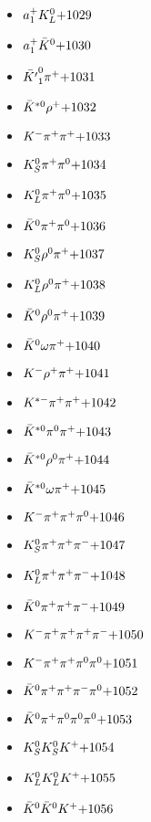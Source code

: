 \begin{multicols}{3}
\begin{itemize}
 \item $ a_{1}^{+} K_{L}^{0} \hfill{+1029}$
 \item $ a_{1}^{+} \bar{K}^{0} \hfill{+1030}$
 \item $ \bar{{K^{\prime}}}_{1}^{0} \pi^{+} \hfill{+1031}$
 \item $ \bar{K}^{*0} \rho^{+} \hfill{+1032}$
 \item $ K^{-} \pi^{+} \pi^{+} \hfill{+1033}$
 \item $ K_{S}^{0} \pi^{+} \pi^{0} \hfill{+1034}$
 \item $ K_{L}^{0} \pi^{+} \pi^{0} \hfill{+1035}$
 \item $ \bar{K}^{0} \pi^{+} \pi^{0} \hfill{+1036}$
 \item $ K_{S}^{0} \rho^{0} \pi^{+} \hfill{+1037}$
 \item $ K_{L}^{0} \rho^{0} \pi^{+} \hfill{+1038}$
 \item $ \bar{K}^{0} \rho^{0} \pi^{+} \hfill{+1039}$
 \item $ \bar{K}^{0} \omega \pi^{+} \hfill{+1040}$
 \item $ K^{-} \rho^{+} \pi^{+} \hfill{+1041}$
 \item $ K^{*-} \pi^{+} \pi^{+} \hfill{+1042}$
 \item $ \bar{K}^{*0} \pi^{0} \pi^{+} \hfill{+1043}$
 \item $ \bar{K}^{*0} \rho^{0} \pi^{+} \hfill{+1044}$
 \item $ \bar{K}^{*0} \omega \pi^{+} \hfill{+1045}$
 \item $ K^{-} \pi^{+} \pi^{+} \pi^{0} \hfill{+1046}$
 \item $ K_{S}^{0} \pi^{+} \pi^{+} \pi^{-} \hfill{+1047}$
 \item $ K_{L}^{0} \pi^{+} \pi^{+} \pi^{-} \hfill{+1048}$
 \item $ \bar{K}^{0} \pi^{+} \pi^{+} \pi^{-} \hfill{+1049}$
 \item $ K^{-} \pi^{+} \pi^{+} \pi^{+} \pi^{-} \hfill{+1050}$
 \item $ K^{-} \pi^{+} \pi^{+} \pi^{0} \pi^{0} \hfill{+1051}$
 \item $ \bar{K}^{0} \pi^{+} \pi^{+} \pi^{-} \pi^{0} \hfill{+1052}$
 \item $ \bar{K}^{0} \pi^{+} \pi^{0} \pi^{0} \pi^{0} \hfill{+1053}$
 \item $ K_{S}^{0} K_{S}^{0} K^{+} \hfill{+1054}$
 \item $ K_{L}^{0} K_{L}^{0} K^{+} \hfill{+1055}$
 \item $ \bar{K}^{0} \bar{K}^{0} K^{+} \hfill{+1056}$

\end{itemize}
\end{multicols}
